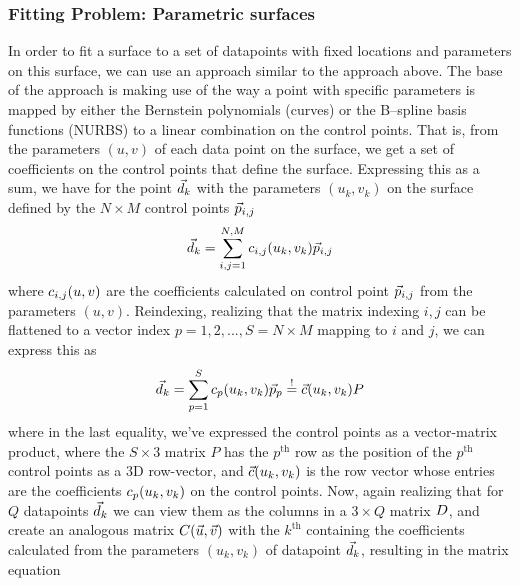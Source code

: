 \subsubsection{Fitting Problem: Parametric surfaces}
In order to fit a \Bez surface to a set of datapoints with fixed locations and parameters on this surface, we can use an approach similar to the approach above. The base of the approach is making use of the way a point with specific parameters is mapped by either the Bernstein polynomials (\Bez curves) or the B--spline basis functions (NURBS) to a linear combination on the control points. That is, from the parameters $(u,v)$ of each data point on the surface, we get a set of coefficients on the control points that define the surface. Expressing this as a sum, we have for the point $\lsDataPointi{k}$ with the parameters $(u_k,v_k)$ on the surface defined by the $N \times M$ control points $\lsControlPointi{i,j}$
\begin{equation}
\lsDataPointi{k} = \sum\limits_{i,j=1}^{N,M} \lsControlPointCoefi{i,j}(u_k,v_k) \lsControlPointi{i,j}
\end{equation} 
where $\lsControlPointCoefi{i,j}(u,v)$ are the coefficients calculated on control point $\lsControlPointi{i,j}$ from the parameters $(u,v)$. Reindexing, realizing that the matrix indexing $i,j$ can be flattened to a vector index $p = 1,2,...,S=N\times M$ mapping to $i$ and $j$, we can express this as
\begin{equation}
\lsDataPointi{k} = \sum\limits_{p=1}^{S} \lsControlPointCoefi{p}(u_k,v_k) \lsControlPointi{p} \overset{!}{=} \vec{\lsControlPointCoef}(u_k,v_k)\lsControlPointMatrix
\label{eqn:lsmatrix1}
\end{equation} 
where in the last equality, we've expressed the control points as a vector-matrix product, where the $S\times 3$ matrix $P$ has the $p^\text{th}$ row as the position of the $p^\text{th}$ control points as a 3D row-vector, and $\vec{\lsControlPointCoef}(u_k,v_k)$ is the row vector whose entries are the coefficients $\lsControlPointCoefi{p}(u_k,v_k)$ on the control points. Now, again realizing that for $Q$ datapoints $\lsDataPointi{k}$ we can view them as the columns in a $3\times Q$ matrix $\lsDataPointMatrix$, and create an analogous matrix $\lsControlPointCoefMatrix(\vec{u},\vec{v})$ with the $k^\text{th}$ containing the coefficients calculated from the parameters $(u_k,v_k)$ of datapoint $\lsDataPointi{k}$, resulting in the matrix equation


